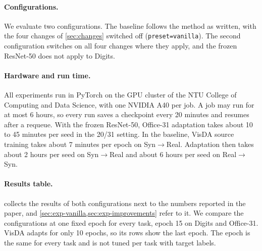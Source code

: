 \paragraph{Configurations.}
We evaluate two configurations.
The baseline follows the method as written, with the four changes of \cref{sec:changes} switched off (\texttt{preset=vanilla}).
The second configuration switches on all four changes where they apply, and the frozen ResNet-50 does not apply to Digits.

\paragraph{Hardware and run time.}
All experiments run in PyTorch on the GPU cluster of the NTU College of Computing and Data Science, with one NVIDIA A40 per job.
A job may run for at most 6 hours, so every run saves a checkpoint every 20 minutes and resumes after a requeue.
With the frozen ResNet-50, Office-31 adaptation takes about 10 to 45 minutes per seed in the 20/31 setting.
In the baseline, VisDA source training takes about 7 minutes per epoch on Syn$\to$Real.
Adaptation then takes about 2 hours per seed on Syn$\to$Real and about 6 hours per seed on Real$\to$Syn.

\paragraph{Results table.}
 collects the results of both configurations next to the numbers reported in the paper, and \cref{sec:exp-vanilla,sec:exp-improvements} refer to it.
We compare the configurations at one fixed epoch for every task, epoch 15 on Digits and Office-31.
VisDA adapts for only 10 epochs, so its rows show the last epoch.
The epoch is the same for every task and is not tuned per task with target labels.

